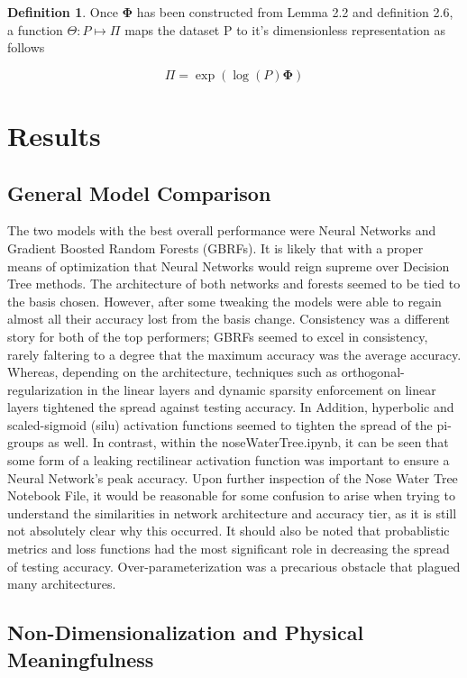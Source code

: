 \documentclass{article}
\theoremstyle{definition}
\newtheorem{definition}{Definition}[section]
\begin{document}
\begin{definition}
    Once $\boldsymbol{\Phi}$ has been constructed from Lemma 2.2 and definition 2.6, a function $\Theta : P \mapsto \Pi$ maps the dataset P to it's dimensionless representation as follows

    $$ \Pi = \exp(\log(P) \boldsymbol{\Phi})$$
\end{definition}

\section{Results}

\subsection{General Model Comparison}

The two models with the best overall performance were Neural Networks and Gradient Boosted Random Forests (GBRFs).  It is likely that with a proper means of optimization that Neural Networks would reign supreme over Decision Tree methods.  The architecture of both networks  and forests seemed to be tied to the basis chosen.  However, after some tweaking the models were able to regain almost all their accuracy lost from the basis change.  Consistency was a different story for both of the top performers;  GBRFs  seemed to excel in consistency, rarely faltering to a degree that the maximum accuracy was the average accuracy.  Whereas,  depending on the architecture, techniques such as  orthogonal-regularization in the linear layers and dynamic sparsity enforcement on linear layers tightened the spread against testing accuracy.  In Addition, hyperbolic and scaled-sigmoid (silu) activation functions seemed to tighten the spread of the pi-groups as well.  In contrast, within the noseWaterTree.ipynb, it can be seen that some form of a leaking rectilinear activation function was important to ensure a Neural Network's peak accuracy.   Upon further inspection of the Nose Water Tree Notebook File,  it would be reasonable for some confusion to arise when trying to understand the similarities in network architecture and accuracy tier, as it is still not absolutely clear why this occurred.  It should also be noted that probablistic metrics and loss functions had the most significant role in decreasing the spread of testing accuracy.  Over-parameterization was a precarious obstacle  that plagued many architectures.  


\subsection{Non-Dimensionalization and Physical Meaningfulness}
\end{document}
